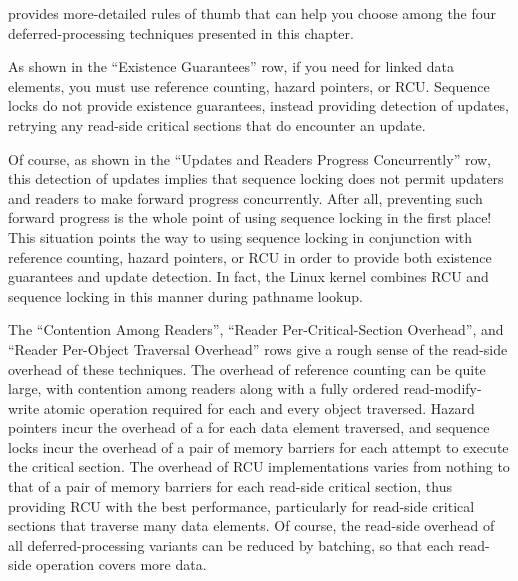 provides more-detailed rules of thumb that can help you choose among the
four deferred-processing techniques presented in this chapter.

As shown in the ``Existence Guarantees'' row,
if you need  for linked
data elements, you must use reference counting, hazard pointers, or RCU\@.
Sequence locks do not provide existence guarantees, instead providing
detection of updates, retrying any read-side critical sections
that do encounter an update.

Of course, as shown in the ``Updates and Readers Progress Concurrently''
row, this detection of updates implies
that sequence locking does not permit updaters and readers to make forward
progress concurrently.
After all, preventing such forward progress is the whole point of using
sequence locking in the first place!
This situation points the way to using sequence locking in conjunction
with reference counting, hazard pointers, or RCU in order to provide
both existence guarantees and update detection.
In fact, the Linux kernel combines RCU and sequence locking in
this manner during pathname lookup.

The ``Contention Among Readers'', ``Reader Per-Critical-Section Overhead'',
and ``Reader Per-Object Traversal Overhead'' rows give a rough sense of
the read-side overhead of these techniques.
The overhead of reference counting can be quite large, with
contention among readers along with a fully ordered read-modify-write
atomic operation required for each and every object traversed.
Hazard pointers incur the overhead of a 
for each data element
traversed, and sequence locks incur the overhead of a pair of memory barriers
for each attempt to execute the critical section.
The overhead of RCU implementations varies from nothing to that of a pair of
memory barriers for each read-side critical section, thus providing RCU
with the best performance, particularly for read-side critical sections
that traverse many data elements.
Of course, the read-side overhead of all deferred-processing variants can
be reduced by batching, so that each read-side operation covers more data.

